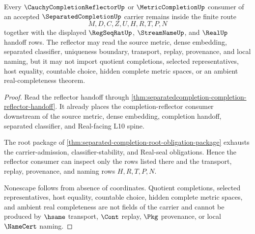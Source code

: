 \begin{theorem}
\label{thm:separated-completion-completion-reflector-nonescape}
Every $\CauchyCompletionReflectorUp$ or $\MetricCompletionUp$ consumer of an accepted $\SeparatedCompletionUp$ carrier remains inside the finite route
$$
M,D,C,Z,U,H,R,T,P,N
$$
together with the displayed $\RegSeqRatUp$, $\StreamNameUp$, and $\RealUp$ handoff rows. The reflector may read the source metric, dense embedding, separated classifier, uniqueness boundary, transport, replay, provenance, and local naming, but it may not import quotient completions, selected representatives, host equality, countable choice, hidden complete metric spaces, or an ambient real-completeness theorem.
\end{theorem}
\begin{proof}
Read the reflector handoff through \autoref{thm:separatedcompletion-completion-reflector-handoff}. It already places the completion-reflector consumer downstream of the source metric, dense embedding, completion handoff, separated classifier, and Real-facing L10 spine.

The root package of \autoref{thm:separated-completion-root-obligation-package} exhausts the carrier-admission, classifier-stability, and Real-seal obligations. Hence the reflector consumer can inspect only the rows listed there and the transport, replay, provenance, and naming rows $H,R,T,P,N$.

Nonescape follows from absence of coordinates. Quotient completions, selected representatives, host equality, countable choice, hidden complete metric spaces, and ambient real completeness are not fields of the carrier and cannot be produced by $\hsame$ transport, $\Cont$ replay, $\Pkg$ provenance, or local $\NameCert$ naming.
\end{proof}

